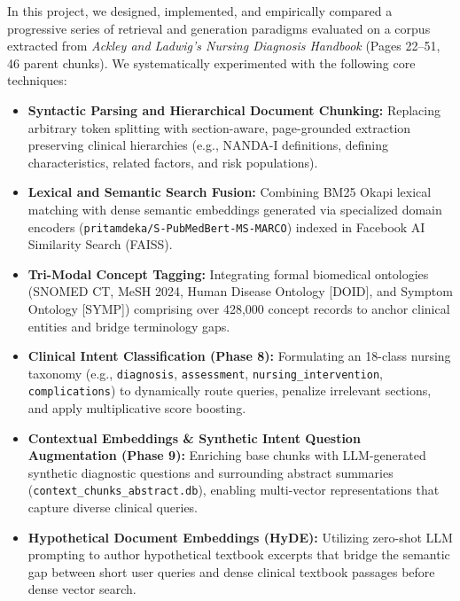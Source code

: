 \documentclass[11pt,a4paper]{article}
\begin{document}
In this project, we designed, implemented, and empirically compared a progressive series of retrieval and generation paradigms evaluated on a corpus extracted from \textit{Ackley and Ladwig's Nursing Diagnosis Handbook} (Pages 22--51, 46 parent chunks). We systematically experimented with the following core techniques:
\begin{itemize}[leftmargin=1.8em, itemsep=0.2em]
    \item \textbf{Syntactic Parsing and Hierarchical Document Chunking:} Replacing arbitrary token splitting with section-aware, page-grounded extraction preserving clinical hierarchies (e.g., NANDA-I definitions, defining characteristics, related factors, and risk populations).
    \item \textbf{Lexical and Semantic Search Fusion:} Combining BM25 Okapi lexical matching with dense semantic embeddings generated via specialized domain encoders (\texttt{pritamdeka/S-PubMedBert-MS-MARCO}) indexed in Facebook AI Similarity Search (FAISS).
    \item \textbf{Tri-Modal Concept Tagging:} Integrating formal biomedical ontologies (SNOMED CT, MeSH 2024, Human Disease Ontology [DOID], and Symptom Ontology [SYMP]) comprising over 428,000 concept records to anchor clinical entities and bridge terminology gaps.
    \item \textbf{Clinical Intent Classification (Phase 8):} Formulating an 18-class nursing taxonomy (e.g., \texttt{diagnosis}, \texttt{assessment}, \texttt{nursing\_intervention}, \texttt{complications}) to dynamically route queries, penalize irrelevant sections, and apply multiplicative score boosting.
    \item \textbf{Contextual Embeddings \& Synthetic Intent Question Augmentation (Phase 9):} Enriching base chunks with LLM-generated synthetic diagnostic questions and surrounding abstract summaries (\texttt{context\_chunks\_abstract.db}), enabling multi-vector representations that capture diverse clinical queries.
    \item \textbf{Hypothetical Document Embeddings (HyDE):} Utilizing zero-shot LLM prompting to author hypothetical textbook excerpts that bridge the semantic gap between short user queries and dense clinical textbook passages before dense vector search.
\end{itemize}

\end{document}
